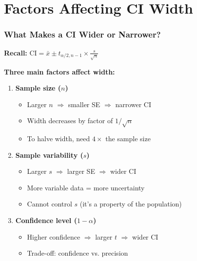 \documentclass{beamer}
\begin{document}
\section{Factors Affecting CI Width}

\begin{frame}
\frametitle{What Makes a CI Wider or Narrower?}
\textbf{Recall:} $\text{CI} = \bar{x} \pm t_{\alpha/2, n-1} \times \frac{s}{\sqrt{n}}$

\vspace{0.5cm}
\textbf{Three main factors affect width:}

\begin{enumerate}
\item \textbf{Sample size ($n$)}
  \begin{itemize}
  \item Larger $n$ $\Rightarrow$ smaller SE $\Rightarrow$ narrower CI
  \item Width decreases by factor of $1/\sqrt{n}$
  \item To halve width, need $4\times$ the sample size
  \end{itemize}

\item \textbf{Sample variability ($s$)}
  \begin{itemize}
  \item Larger $s$ $\Rightarrow$ larger SE $\Rightarrow$ wider CI
  \item More variable data = more uncertainty
  \item Cannot control $s$ (it's a property of the population)
  \end{itemize}

\item \textbf{Confidence level ($1-\alpha$)}
  \begin{itemize}
  \item Higher confidence $\Rightarrow$ larger $t$ $\Rightarrow$ wider CI
  \item Trade-off: confidence vs. precision
  \end{itemize}
\end{enumerate}
\end{frame}
\end{document}
